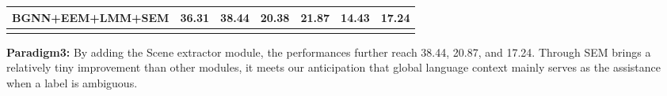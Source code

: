 \documentclass[runningheads]{llncs}
\begin{document}
\begin{table}[t]
{\begin{tabular}{ccccccc}
      BGNN+EEM+LMM+SEM                                                 &
      \textbf{36.31}                                                   & \textbf{\textbf{38.44}}   & \textbf{20.38}          &
      \textbf{\textbf{21.87}}                                          & 14.43                     & \textbf{\textbf{17.24}}          \\
      \hline
      \multicolumn{1}{l}{}                                             &
      \multicolumn{1}{l}{}                                             & \multicolumn{1}{l}{}      & \multicolumn{1}{l}{}    &
      \multicolumn{1}{l}{}                                             & \multicolumn{1}{l}{}      & \multicolumn{1}{l}{}
    \end{tabular}
  }
\end{table}

\noindent\textbf{Paradigm3:} By adding the Scene extractor module, the
performances further reach 38.44, 20.87, and 17.24. Through SEM brings a
relatively tiny improvement than other modules, it meets our anticipation that
global language context mainly serves as the assistance when a label is
ambiguous.
\end{document}
